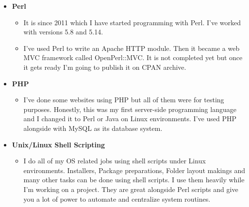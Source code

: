 \documentclass[12pt,a4paper]{article}
\begin{document}
\begin{itemize}
\begin{itemize}
				\end{itemize}
			\item \textbf{Perl} 
				\begin{itemize}
					\item It is since 2011 which I have started programming with Perl. I've worked with versions 5.8 and 5.14.
					\item I've used Perl to write an Apache HTTP module. Then it became a web MVC framework called OpenPerl::MVC. It is not completed yet but once it gets ready I'm going to publish it on CPAN archive.
				\end{itemize}
			\item \textbf{PHP}
				\begin{itemize}
					\item I've done some websites using PHP but all of them were for testing purposes. Honestly, this was my first server-side programming language and I changed it to Perl or Java on Linux environments. I've used PHP alongside with MySQL as its database system.
				\end{itemize}
			\item \textbf{Unix/Linux Shell Scripting}
				\begin{itemize}
					\item I do all of my OS related jobs using shell scripts under Linux environments. Installers, Package preparations, Folder layout makings and many other tasks can be done using shell scripts. I use them heavily while I'm working on a project. They are great alongside Perl scripts and give you a lot of power to automate and centralize system routines.
				\end{itemize}
		\end{itemize}
		
\end{document}

